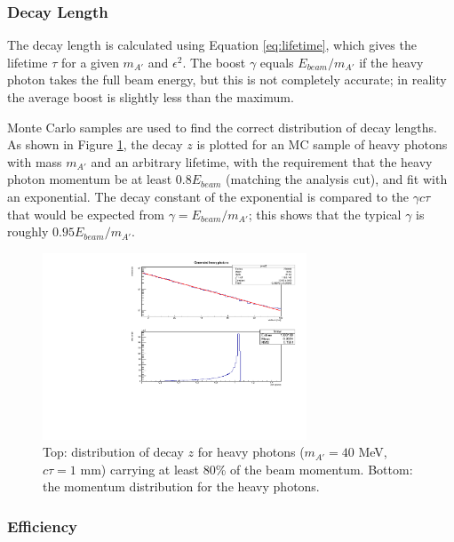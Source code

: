 \subsubsection{Decay Length}
The decay length is calculated using Equation \ref{eq:lifetime}, which gives the lifetime $\tau$ for a given $m_{A'}$ and $\epsilon^2$.
The boost $\gamma$ equals $E_{beam}/m_{A'}$ if the heavy photon takes the full beam energy, but this is not completely accurate; in reality the average boost is slightly less than the maximum.

Monte Carlo samples are used to find the correct distribution of decay lengths.
As shown in Figure \ref{fig:decay_z_truth}, the decay $z$ is plotted for an MC sample of heavy photons with mass $m_{A'}$ and an arbitrary lifetime, with the requirement that the heavy photon momentum be at least $0.8E_{beam}$ (matching the analysis cut), and fit with an exponential.
The decay constant of the exponential is compared to the $\gamma c \tau$ that would be expected from $\gamma=E_{beam}/m_{A'}$; this shows that the typical $\gamma$ is roughly $0.95E_{beam}/m_{A'}$.

\begin{figure}[ht]
\begin{center}
    \includegraphics[width=0.7\textwidth,page=1,angle=-90]{vertexing/figs/acceptance_40}
\end{center}
    \caption{Top: distribution of decay $z$ for heavy photons ($m_{A'}=40$ MeV, $c\tau=1$ mm) carrying at least 80\% of the beam momentum. Bottom: the momentum distribution for the heavy photons.}
    \label{fig:decay_z_truth}
\end{figure}

\subsubsection{Efficiency}
\label{sec:efficiency_z}

